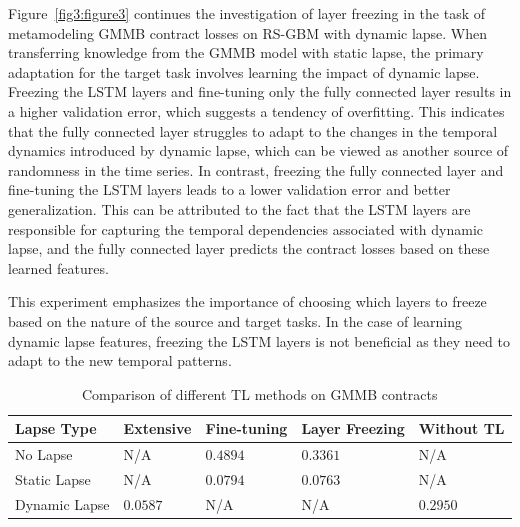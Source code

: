 Figure~\ref{fig3:figure3} continues the investigation of layer freezing in the task of metamodeling GMMB contract losses on RS-GBM with dynamic lapse. 
When transferring knowledge from the GMMB model with static lapse, the primary adaptation for the target task involves learning the impact of dynamic lapse.
Freezing the LSTM layers and fine-tuning only the fully connected layer results in a higher validation error, which suggests a tendency of overfitting.
This indicates that the fully connected layer struggles to adapt to the changes in the temporal dynamics introduced by dynamic lapse, which can be viewed as another source of randomness in the time series.
In contrast, freezing the fully connected layer and fine-tuning the LSTM layers leads to a lower validation error and better generalization. 
This can be attributed to the fact that the LSTM layers are responsible for capturing the temporal dependencies associated with dynamic lapse, and the fully connected layer predicts the contract losses based on these learned features.

This experiment emphasizes the importance of choosing which layers to freeze based on the nature of the source and target tasks. 
In the case of learning dynamic lapse features, freezing the LSTM layers is not beneficial as they need to adapt to the new temporal patterns.

\begin{table}[ht!]
    \centering
    \begin{tabular}{lllll}
    \toprule
    \textbf{Lapse Type} & \textbf{Extensive} & \textbf{Fine-tuning} & \textbf{Layer Freezing} & \textbf{Without TL} \\
    \midrule
    No Lapse & N/A & $0.4894$ & $0.3361$ & N/A \\
    Static Lapse & N/A & $0.0794$ & $0.0763$ & N/A \\
    Dynamic Lapse & $0.0587$ &  N/A &  N/A & $0.2950$ \\
    \bottomrule
    \end{tabular}
    \caption{Comparison of different TL methods on GMMB contracts}
    \label{tab3:transfer_learning_results}
\end{table}

